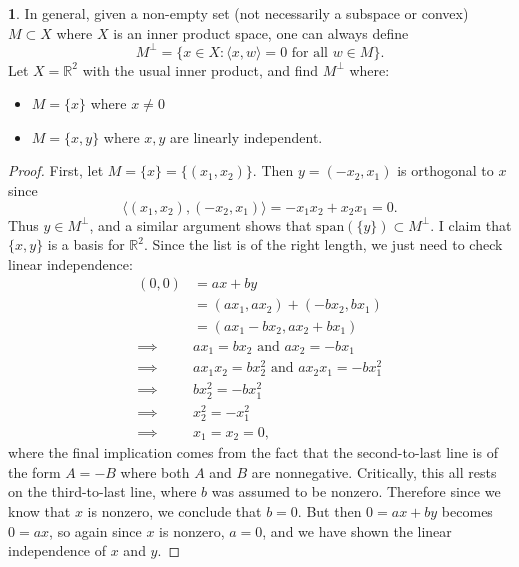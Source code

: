 \documentclass[12pt]{article}
\theoremstyle{definition}
\newtheorem{ex}{}
\begin{document}
\begin{ex}
	In general, given a non-empty set (not necessarily a subspace or convex) $M \subset X$ where $X$ is an inner product space, one can always define \begin{equation*}
		M^\perp = \lbrace x \in X  : \langle x, w \rangle = 0 \text{ for all } w \in M \rbrace.
	\end{equation*}
	Let $X = \mathbb{R}^2$ with the usual inner product, and find $M^\perp$ where: \begin{itemize}
		\item $M = \lbrace x \rbrace$  where  $x \neq 0$
		\item $M = \lbrace x, y \rbrace$  where  $x, y$  are linearly independent.
	\end{itemize}
\end{ex}
\begin{proof}
	First, let $M = \lbrace x \rbrace = \lbrace (x_1, x_2) \rbrace$.
	Then $y = (-x_2, x_1)$ is orthogonal to $x$ since \begin{equation*}
		\langle (x_1, x_2), (-x_2, x_1) \rangle = -x_1x_2 + x_2x_1 = 0.
	\end{equation*}
	Thus $y \in M^\perp$, and a similar argument shows that $\mathrm{span}(\lbrace y \rbrace) \subset M^\perp$.
	I claim that $\lbrace x, y \rbrace$ is a basis for $\mathbb{R}^2$.
	Since the list is of the right length, we just need to check linear independence: \begin{align*}
		(0, 0)   & = ax + by                                       \\
		         & = (ax_1, ax_2) + (-bx_2, bx_1)                  \\
		         & = (ax_1 - bx_2, ax_2 + bx_1)                    \\
		\implies & ax_1 = bx_2 \text{ and } ax_2 = -bx_1           \\
		\implies & ax_1x_2 = bx_2^2 \text{ and } ax_2x_1 = -bx_1^2 \\
		\implies & bx_2^2 = -bx_1^2                                \\
		\implies & x_2^2 = -x_1^2                                  \\
		\implies & x_1 = x_2 = 0,
	\end{align*}
	where the final implication comes from the fact that the second-to-last line is of the form $A = -B$ where both $A$ and $B$ are nonnegative.
	Critically, this all rests on the third-to-last line, where $b$ was assumed to be nonzero.
	Therefore since we know that $x$ is nonzero, we conclude that $b = 0$.
	But then $0 = ax + by$ becomes $0 = ax$, so again since $x$ is nonzero, $a = 0$, and we have shown the linear independence of $x$ and $y$.


\end{proof}
\end{document}
